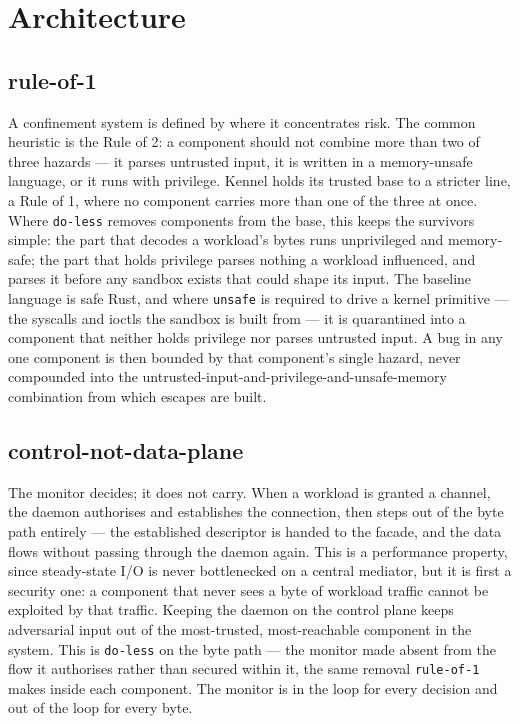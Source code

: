 \hypertarget{architecture}{%
\section{Architecture}\label{architecture}}

\hypertarget{rule-of-1}{%
\subsection{\texorpdfstring{rule-of-1}{rule-of-1}}\label{rule-of-1}}

A confinement system is defined by where it concentrates risk. The
common heuristic is the Rule of 2: a component should not combine more
than two of three hazards --- it parses untrusted input, it is written
in a memory-unsafe language, or it runs with privilege. Kennel holds its
trusted base to a stricter line, a Rule of 1, where no component carries
more than one of the three at once. Where \texttt{do-less} removes
components from the base, this keeps the survivors simple: the part that
decodes a workload's bytes runs unprivileged and memory-safe; the part
that holds privilege parses nothing a workload influenced, and parses it
before any sandbox exists that could shape its input. The baseline
language is safe Rust, and where \texttt{unsafe} is required to drive a
kernel primitive --- the syscalls and ioctls the sandbox is built from
--- it is quarantined into a component that neither holds privilege nor
parses untrusted input. A bug in any one component is then bounded by
that component's single hazard, never compounded into the
untrusted-input-and-privilege-and-unsafe-memory combination from which
escapes are built.

\hypertarget{control-not-data-plane}{%
\subsection{\texorpdfstring{control-not-data-plane}{control-not-data-plane}}\label{control-not-data-plane}}

The monitor decides; it does not carry. When a workload is granted a
channel, the daemon authorises and establishes the connection, then
steps out of the byte path entirely --- the established descriptor is
handed to the facade, and the data flows without passing through the
daemon again. This is a performance property, since steady-state I/O is
never bottlenecked on a central mediator, but it is first a security
one: a component that never sees a byte of workload traffic cannot be
exploited by that traffic. Keeping the daemon on the control plane keeps
adversarial input out of the most-trusted, most-reachable component in
the system. This is \texttt{do-less} on the byte path --- the monitor
made absent from the flow it authorises rather than secured within it,
the same removal \texttt{rule-of-1} makes inside each component. The
monitor is in the loop for every decision and out of the loop for every
byte.

